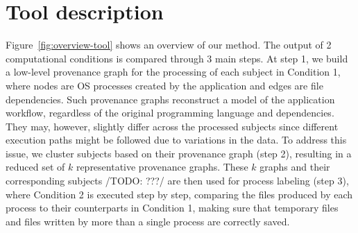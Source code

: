\documentclass[a4paper,num-refs]{oup-contemporary}
\begin{document}



\section{Tool description}

Figure~\ref{fig:overview-tool} shows an overview of our method. The output
of 2 computational conditions is compared through 3 main steps. At step 1,
we build a low-level provenance graph for the processing of each subject in
Condition 1, where nodes are OS processes created by the application and
edges are file dependencies. Such provenance graphs reconstruct a model of
the application workflow, regardless of the original programming language
and dependencies. They may, however, slightly differ across the processed
subjects since different execution paths might be followed due to
variations in the data. To address this issue, we cluster subjects based on
their provenance graph (step 2), resulting in a reduced set of $k$
representative provenance graphs. These $k$ graphs and their corresponding
subjects /TODO: ???/ are then used for process labeling (step 3), where
Condition 2 is executed step by step, comparing the files produced by each
process to their counterparts in Condition 1, making sure that temporary
files and files written by more than a single process are correctly saved.
\end{document}
